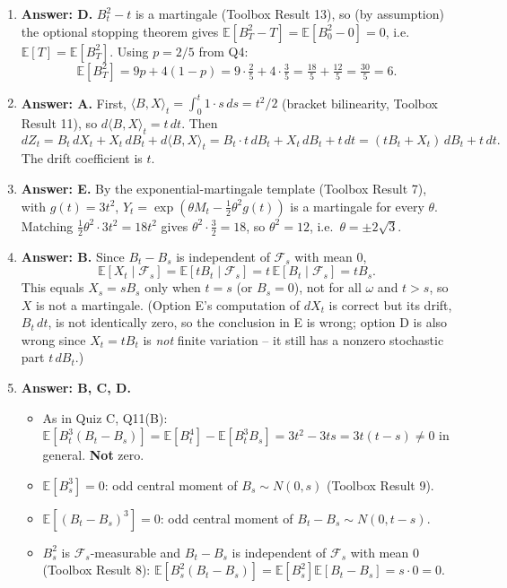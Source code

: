 \documentclass[11pt]{article}
\newcommand{\E}{\mathbb{E}}
\newcommand{\ans}[1]{\par\noindent\textbf{\color{blue!50!black}Answer: #1}}
\begin{document}
\begin{enumerate}
\item[\textbf{Q5.}] \ans{D.} $B_t^2-t$ is a martingale (Toolbox Result 13), so (by assumption) the optional stopping theorem gives $\E[B_T^2-T]=\E[B_0^2-0]=0$, i.e.\ $\E[T]=\E[B_T^2]$. Using $p=2/5$ from Q4:
\[
\E[B_T^2]=9p+4(1-p)=9\cdot\tfrac25+4\cdot\tfrac35=\tfrac{18}5+\tfrac{12}5=\tfrac{30}5=6.
\]

\item[\textbf{Q6.}] \ans{A.} First, $\langle B,X\rangle_t=\int_0^t1\cdot s\,ds=t^2/2$ (bracket bilinearity, Toolbox Result 11), so $d\langle B,X\rangle_t=t\,dt$. Then
\[
dZ_t=B_t\,dX_t+X_t\,dB_t+d\langle B,X\rangle_t=B_t\cdot t\,dB_t+X_t\,dB_t+t\,dt=(tB_t+X_t)\,dB_t+t\,dt.
\]
The drift coefficient is $t$.

\item[\textbf{Q7.}] \ans{E.} By the exponential-martingale template (Toolbox Result 7), with $g(t)=3t^2$, $Y_t=\exp(\theta M_t-\tfrac12\theta^2g(t))$ is a martingale for every $\theta$. Matching $\tfrac12\theta^2\cdot3t^2=18t^2$ gives $\theta^2\cdot\tfrac32=18$, so $\theta^2=12$, i.e.\ $\theta=\pm2\sqrt3$.

\item[\textbf{Q8.}] \ans{B.} Since $B_t-B_s$ is independent of $\mathcal F_s$ with mean $0$,
\[
\E[X_t\mid\mathcal F_s]=\E[tB_t\mid\mathcal F_s]=t\,\E[B_t\mid\mathcal F_s]=tB_s.
\]
This equals $X_s=sB_s$ only when $t=s$ (or $B_s=0$), not for all $\omega$ and $t>s$, so $X$ is not a martingale. (Option E's computation of $dX_t$ is correct but its drift, $B_t\,dt$, is not identically zero, so the conclusion in E is wrong; option D is also wrong since $X_t=tB_t$ is \emph{not} finite variation -- it still has a nonzero stochastic part $t\,dB_t$.)

\item[\textbf{Q9.}] \ans{B, C, D.}
\begin{itemize}[nosep]
\item[A] As in Quiz C, Q11(B): $\E[B_t^3(B_t-B_s)]=\E[B_t^4]-\E[B_t^3B_s]=3t^2-3ts=3t(t-s)\ne0$ in general. \textbf{Not} zero.
\item[B] $\E[B_s^3]=0$: odd central moment of $B_s\sim N(0,s)$ (Toolbox Result 9).
\item[C] $\E[(B_t-B_s)^3]=0$: odd central moment of $B_t-B_s\sim N(0,t-s)$.
\item[D] $B_s^2$ is $\mathcal F_s$-measurable and $B_t-B_s$ is independent of $\mathcal F_s$ with mean $0$ (Toolbox Result 8): $\E[B_s^2(B_t-B_s)]=\E[B_s^2]\E[B_t-B_s]=s\cdot0=0$.
\end{itemize}


\end{enumerate}
\end{document}

